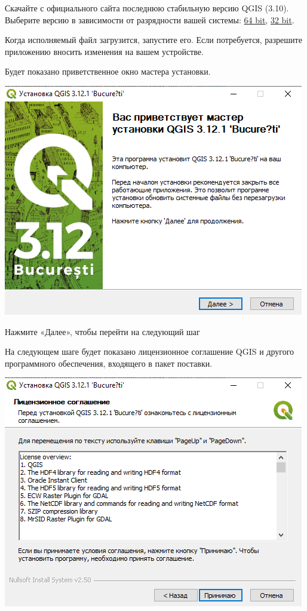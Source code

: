 \documentclass[
  12pt,
]{book}
\begin{document}
Скачайте с официального сайта последнюю стабильную версию QGIS (3.10). Выберите версию в зависимости от разрядности вашей системы: \href{https://qgis.org/downloads/QGIS-OSGeo4W-3.10.3-3-Setup-x86_64.exe}{64 bit}, \href{https://qgis.org/downloads/QGIS-OSGeo4W-3.10.3-3-Setup-x86.exe}{32 bit}.

Когда исполняемый файл загрузится, запустите его. Если потребуется, разрешите приложению вносить изменения на вашем устройстве.

Будет показано приветственное окно мастера установки.

\includegraphics{images/installation_instruction_win/win01.png}

Нажмите «Далее», чтобы перейти на следующий шаг

На следующем шаге будет показано лицензионное соглашение QGIS и другого программного обеспечения, входящего в пакет поставки.

\includegraphics{images/installation_instruction_win/win02.png}
\end{document}
